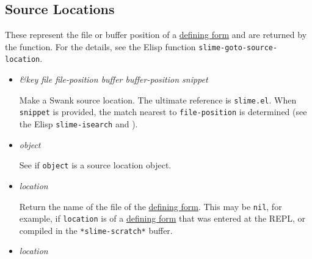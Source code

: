 \subsection{Source Locations}\label{source-locations}

\label{x-28DREF-EXT-3A-40SOURCE-LOCATIONS-20MGL-PAX-3ASECTION-29}

These represent the file or buffer position of a
\href{http://www.lispworks.com/documentation/HyperSpec/Body/26_glo_d.htm\#defining_form}{defining
form} and are returned by the
function. For the details, see the Elisp function
\texttt{slime-goto-source-location}.

\begin{itemize}
\item
  \label{x-28DREF-EXT-3AMAKE-SOURCE-LOCATION-20FUNCTION-29}
  \emph{\&key file file-position buffer buffer-position snippet}

  Make a Swank source location. The ultimate reference is
  \texttt{slime.el}. When \texttt{snippet} is provided, the match
  nearest to \texttt{file-position} is determined (see the Elisp
  \texttt{slime-isearch} and
  ).
\item
  \label{x-28DREF-EXT-3ASOURCE-LOCATION-P-20FUNCTION-29}
  \emph{object}

  See if \texttt{object} is a source location object.
\item
  \label{x-28DREF-EXT-3ASOURCE-LOCATION-FILE-20FUNCTION-29}
  \emph{location}

  Return the name of the file of the
  \href{http://www.lispworks.com/documentation/HyperSpec/Body/26_glo_d.htm\#defining_form}{defining
  form}. This may be \texttt{nil}, for example, if \texttt{location} is
  of a
  \href{http://www.lispworks.com/documentation/HyperSpec/Body/26_glo_d.htm\#defining_form}{defining
  form} that was entered at the REPL, or compiled in the
  \texttt{*slime-scratch*} buffer.
\item
  \label{x-28DREF-EXT-3ASOURCE-LOCATION-FILE-POSITION-20FUNCTION-29}
  \emph{location}


\end{itemize}
